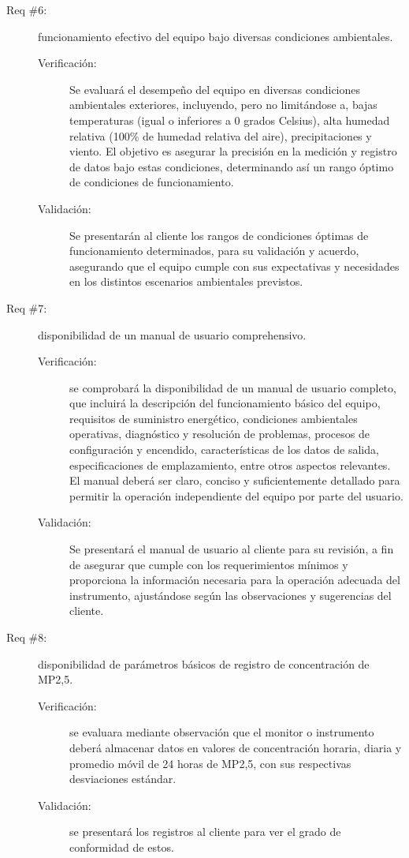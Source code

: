 \begin{description}
	\item [Req \#6:] funcionamiento efectivo del equipo bajo diversas condiciones ambientales.
	
	\begin{description}
		\item [Verificación:] Se evaluará el desempeño del equipo en diversas condiciones ambientales exteriores, incluyendo, pero no limitándose a, bajas temperaturas (igual o inferiores a 0 grados Celsius), alta humedad relativa (100\% de humedad relativa del aire), precipitaciones y viento. El objetivo es asegurar la precisión en la medición y registro de datos bajo estas condiciones, determinando así un rango óptimo de condiciones de funcionamiento.
		\item [Validación:] Se presentarán al cliente los rangos de condiciones óptimas de funcionamiento determinados, para su validación y acuerdo, asegurando que el equipo cumple con sus expectativas y necesidades en los distintos escenarios ambientales previstos.
	\end{description}


\item [Req \#7:] disponibilidad de un manual de usuario comprehensivo.

\begin{description}
	\item [Verificación:] se comprobará la disponibilidad de un manual de usuario completo, que incluirá la descripción del funcionamiento básico del equipo, requisitos de suministro energético, condiciones ambientales operativas, diagnóstico y resolución de problemas, procesos de configuración y encendido, características de los datos de salida, especificaciones de emplazamiento, entre otros aspectos relevantes. El manual deberá ser claro, conciso y suficientemente detallado para permitir la operación independiente del equipo por parte del usuario.
	\item [Validación:] Se presentará el manual de usuario al cliente para su revisión, a fin de asegurar que cumple con los requerimientos mínimos y proporciona la información necesaria para la operación adecuada del instrumento, ajustándose según las observaciones y sugerencias del cliente.
\end{description}

\item [Req \#8:] disponibilidad de parámetros básicos de registro de concentración de MP2,5.

\begin{description}
	\item [Verificación:] se evaluara mediante observación que el monitor o instrumento deberá almacenar datos en valores de concentración horaria, diaria y promedio móvil de 24 horas de MP2,5, con sus respectivas desviaciones estándar.
	\item [Validación:] se presentará los registros al cliente para ver el grado de conformidad de estos.
\end{description}


\end{description}
